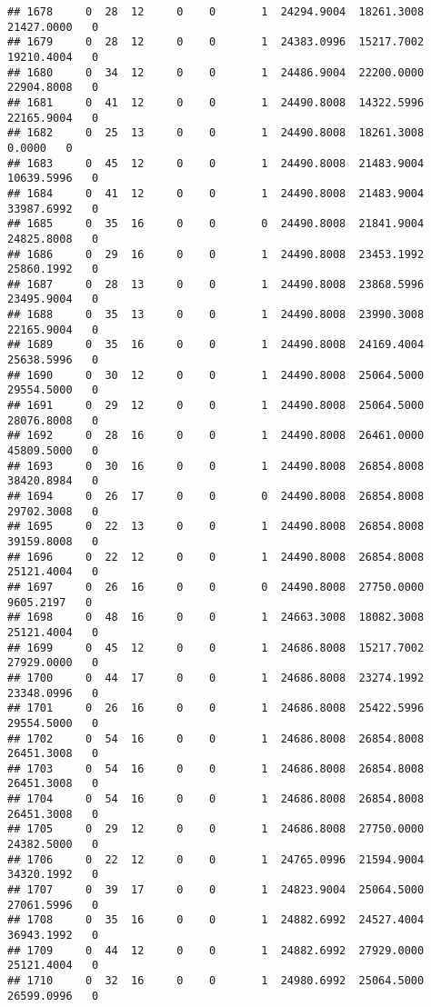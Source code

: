 \documentclass[
]{article}
\begin{document}
\begin{enumerate}
\begin{verbatim}
## 1678     0  28  12     0    0       1  24294.9004  18261.3008  21427.0000   0
## 1679     0  28  12     0    0       1  24383.0996  15217.7002  19210.4004   0
## 1680     0  34  12     0    0       1  24486.9004  22200.0000  22904.8008   0
## 1681     0  41  12     0    0       1  24490.8008  14322.5996  22165.9004   0
## 1682     0  25  13     0    0       1  24490.8008  18261.3008      0.0000   0
## 1683     0  45  12     0    0       1  24490.8008  21483.9004  10639.5996   0
## 1684     0  41  12     0    0       1  24490.8008  21483.9004  33987.6992   0
## 1685     0  35  16     0    0       0  24490.8008  21841.9004  24825.8008   0
## 1686     0  29  16     0    0       1  24490.8008  23453.1992  25860.1992   0
## 1687     0  28  13     0    0       1  24490.8008  23868.5996  23495.9004   0
## 1688     0  35  13     0    0       1  24490.8008  23990.3008  22165.9004   0
## 1689     0  35  16     0    0       1  24490.8008  24169.4004  25638.5996   0
## 1690     0  30  12     0    0       1  24490.8008  25064.5000  29554.5000   0
## 1691     0  29  12     0    0       1  24490.8008  25064.5000  28076.8008   0
## 1692     0  28  16     0    0       1  24490.8008  26461.0000  45809.5000   0
## 1693     0  30  16     0    0       1  24490.8008  26854.8008  38420.8984   0
## 1694     0  26  17     0    0       0  24490.8008  26854.8008  29702.3008   0
## 1695     0  22  13     0    0       1  24490.8008  26854.8008  39159.8008   0
## 1696     0  22  12     0    0       1  24490.8008  26854.8008  25121.4004   0
## 1697     0  26  16     0    0       0  24490.8008  27750.0000   9605.2197   0
## 1698     0  48  16     0    0       1  24663.3008  18082.3008  25121.4004   0
## 1699     0  45  12     0    0       1  24686.8008  15217.7002  27929.0000   0
## 1700     0  44  17     0    0       1  24686.8008  23274.1992  23348.0996   0
## 1701     0  26  16     0    0       1  24686.8008  25422.5996  29554.5000   0
## 1702     0  54  16     0    0       1  24686.8008  26854.8008  26451.3008   0
## 1703     0  54  16     0    0       1  24686.8008  26854.8008  26451.3008   0
## 1704     0  54  16     0    0       1  24686.8008  26854.8008  26451.3008   0
## 1705     0  29  12     0    0       1  24686.8008  27750.0000  24382.5000   0
## 1706     0  22  12     0    0       1  24765.0996  21594.9004  34320.1992   0
## 1707     0  39  17     0    0       1  24823.9004  25064.5000  27061.5996   0
## 1708     0  35  16     0    0       1  24882.6992  24527.4004  36943.1992   0
## 1709     0  44  12     0    0       1  24882.6992  27929.0000  25121.4004   0
## 1710     0  32  16     0    0       1  24980.6992  25064.5000  26599.0996   0

\end{verbatim}
\end{enumerate}
\end{document}
